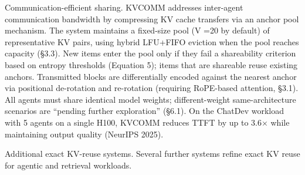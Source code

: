 \documentclass[preprint,12pt]{elsarticle}
\begin{document}
Communication-efficient sharing. KVCOMM \cite{v5ref43} addresses inter-agent communication bandwidth by compressing KV cache transfers via an anchor pool mechanism. The system maintains a fixed-size pool (V =20 by default) of representative KV pairs, using hybrid LFU+FIFO eviction when the pool reaches capacity (\S{}3.3). New items enter the pool only if they fail a shareability criterion based on entropy thresholds (Equation 5); items that are shareable reuse existing anchors. Transmitted blocks are differentially encoded against the nearest anchor via positional de-rotation and re-rotation (requiring RoPE-based attention, \S{}3.1). All agents must share identical model weights; different-weight same-architecture scenarios are ``pending further exploration'' (\S{}6.1). On the ChatDev workload with 5 agents on a single H100, KVCOMM reduces TTFT by up to 3.6$\times$ while maintaining output quality (NeurIPS 2025).




Additional exact KV-reuse systems. Several further systems refine exact KV reuse for agentic and retrieval workloads.
\end{document}
